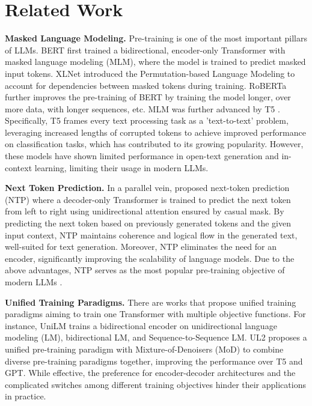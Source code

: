 \section{Related Work}

\textbf{Masked Language Modeling.} Pre-training is one of the most important pillars of LLMs. BERT first trained a bidirectional, encoder-only Transformer with masked language modeling (MLM), where the model is trained to predict masked input tokens. XLNet \citep{yang2019xlnet} introduced the Permutation-based Language Modeling to account for dependencies between masked tokens during training. RoBERTa\cite{liu2019roberta} further improves 
the pre-training of BERT by training the model longer,
over more data, with longer sequences, etc. MLM was further advanced by T5 \citep{roberts2019exploring}. Specifically, T5 frames every text processing task as a 'text-to-text' problem, leveraging increased lengths of corrupted tokens to achieve improved performance on classification tasks, which has contributed to its growing popularity. However, these models have shown limited performance in open-text generation and in-context learning, limiting their usage in modern LLMs.

\textbf{Next Token Prediction.} In a parallel vein, \citet{radford2019language} proposed next-token prediction (NTP) where a decoder-only Transformer is trained to predict the next token from left to right using unidirectional attention ensured by casual mask. By predicting the next token based on previously generated tokens and the given input context, NTP maintains coherence and logical flow in the generated text, well-suited for text generation. Moreover, NTP eliminates the need for an encoder, significantly improving the scalability of language models. Due to the above advantages, NTP serves as the most popular pre-training objective of modern LLMs \citep{brown2020language,achiam2023gpt,touvron2023llama,jiang2023mistral,yang2024qwen2,liu2024deepseek}. 

\textbf{Unified Training Paradigms.} There are works that propose unified training paradigms aiming to train one Transformer with multiple objective functions. For instance, UniLM \citep{dong2019unified} trains a bidirectional encoder on unidirectional language modeling (LM), bidirectional LM, and Sequence-to-Sequence LM. UL2 \citep{tay2022ul2} proposes a unified pre-training paradigm with Mixture-of-Denoisers (MoD) to combine diverse pre-training paradigms together, improving the performance over T5 and GPT. 
While effective, the preference for encoder-decoder architectures and the complicated switches among different training objectives hinder their applications in practice. 

